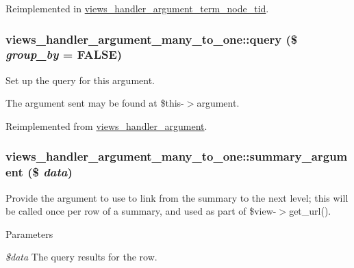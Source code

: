 Reimplemented in \hyperlink{classviews__handler__argument__term__node__tid_af00552a1378333434154989c051d0e98}{views\_\-handler\_\-argument\_\-term\_\-node\_\-tid}.\hypertarget{classviews__handler__argument__many__to__one_acea956eb95d4490acf996a8282d4aedd}{
\subsubsection[{query}]{\setlength{\rightskip}{0pt plus 5cm}views\_\-handler\_\-argument\_\-many\_\-to\_\-one::query (\$ {\em group\_\-by} = {\ttfamily FALSE})}}
\label{classviews__handler__argument__many__to__one_acea956eb95d4490acf996a8282d4aedd}
Set up the query for this argument.

The argument sent may be found at \$this-\/$>$argument. 

Reimplemented from \hyperlink{classviews__handler__argument_af9ddabf5d386782c8ffc5785b7ae4263}{views\_\-handler\_\-argument}.\hypertarget{classviews__handler__argument__many__to__one_a94fb0499ff1078d0423de06d33e898a5}{
\subsubsection[{summary\_\-argument}]{\setlength{\rightskip}{0pt plus 5cm}views\_\-handler\_\-argument\_\-many\_\-to\_\-one::summary\_\-argument (\$ {\em data})}}
\label{classviews__handler__argument__many__to__one_a94fb0499ff1078d0423de06d33e898a5}
Provide the argument to use to link from the summary to the next level; this will be called once per row of a summary, and used as part of \$view-\/$>$get\_\-url().


\begin{DoxyParams}{Parameters}
\item[{\em \$data}]The query results for the row. \end{DoxyParams}


